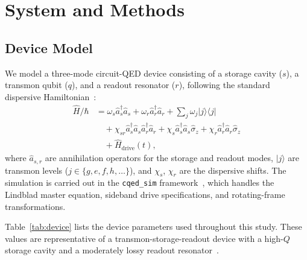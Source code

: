 \documentclass[aps,pra,twocolumn,reprint,floatfix,amsmath,amssymb]{revtex4-2}
\begin{document}
\section{System and Methods}
\label{sec:methods}

\subsection{Device Model}
\label{sec:device}

We model a three-mode circuit-QED device consisting of a storage cavity ($s$), a transmon qubit ($q$), and a readout resonator ($r$), following the standard dispersive Hamiltonian~\cite{blais2004cavity,blais2021circuit,koch2007transmon}:
\begin{align}
\label{eq:hamiltonian}
\hat{H}/\hbar &= \omega_s \hat{a}_s^\dagger \hat{a}_s + \omega_r \hat{a}_r^\dagger \hat{a}_r + \sum_j \omega_j |j\rangle\langle j| \nonumber \\
&\quad + \chi_{sr} \hat{a}_s^\dagger \hat{a}_s \hat{a}_r^\dagger \hat{a}_r + \chi_s \hat{a}_s^\dagger \hat{a}_s \hat{\sigma}_z + \chi_r \hat{a}_r^\dagger \hat{a}_r \hat{\sigma}_z \nonumber \\
&\quad + \hat{H}_{\mathrm{drive}}(t),
\end{align}
where $\hat{a}_{s,r}$ are annihilation operators for the storage and readout modes, $|j\rangle$ are transmon levels ($j \in \{g, e, f, h, \ldots\}$), and $\chi_s$, $\chi_r$ are the dispersive shifts.
The simulation is carried out in the \texttt{cqed\_sim} framework~\cite{cqedsim2026}, which handles the Lindblad master equation, sideband drive specifications, and rotating-frame transformations.

Table~\ref{tab:device} lists the device parameters used throughout this study.
These values are representative of a transmon-storage-readout device with a high-$Q$ storage cavity and a moderately lossy readout resonator~\cite{Reagor2016,krantz2019quantum}.
\end{document}

